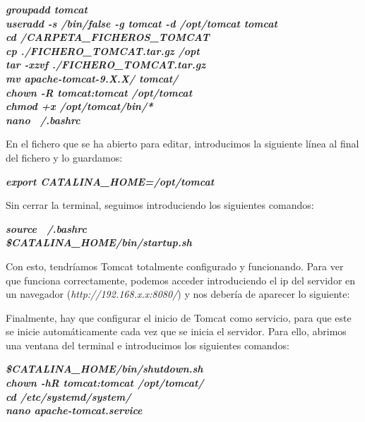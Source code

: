\begin{center}
	\textbf{\textit{
	groupadd tomcat \\
	useradd -s /bin/false -g tomcat -d /opt/tomcat tomcat \\
	cd /CARPETA\_FICHEROS\_TOMCAT \\
	cp ./FICHERO\_TOMCAT.tar.gz /opt \\
	tar -xzvf ./FICHERO\_TOMCAT.tar.gz \\
	mv apache-tomcat-9.X.X/ tomcat/ \\
	chown -R tomcat:tomcat /opt/tomcat \\
	chmod +x /opt/tomcat/bin/* \\
	nano ~/.bashrc \\
	}}
\end{center}

En el fichero que se ha abierto para editar, introducimos la siguiente línea al final del fichero y lo guardamos:

\begin{flushleft}
	\textbf{\textit{export CATALINA\_HOME=/opt/tomcat}}
\end{flushleft}

Sin cerrar la terminal, seguimos introduciendo los siguientes comandos:

\begin{center}
	\textbf{\textit{
	source ~/.bashrc \\
	\$CATALINA\_HOME/bin/startup.sh
	}}
\end{center}

Con esto, tendríamos Tomcat totalmente configurado  y funcionando. Para ver que funciona correctamente, podemos acceder introduciendo el ip del servidor en un navegador (\textit{http://192.168.x.x:8080/}) y nos debería de aparecer lo siguiente:


Finalmente, hay que configurar el inicio de Tomcat como servicio, para que este se inicie automáticamente cada vez que se inicia el servidor. Para ello, abrimos una ventana del terminal e introducimos los siguientes comandos:

\begin{center}
	\textbf{\textit{
	\$CATALINA\_HOME/bin/shutdown.sh \\
	chown -hR tomcat:tomcat /opt/tomcat/ \\
	cd /etc/systemd/system/ \\
	nano apache-tomcat.service
	}}
\end{center}

